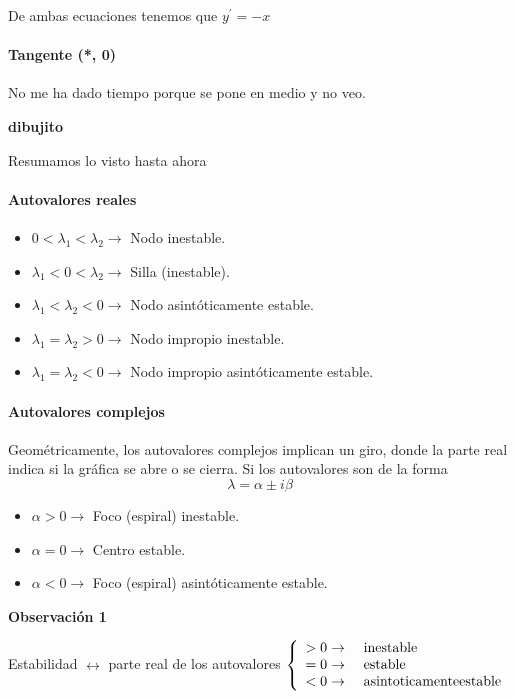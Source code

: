 \begin{example}
De ambas ecuaciones tenemos que $y^\prime = -x$

\paragraph{Tangente (*, 0)}
No me ha dado tiempo porque se pone en medio y no veo.

\textbf{dibujito}

\end{example}

Resumamos lo visto hasta ahora
\paragraph{Autovalores reales}
\begin{itemize}
\item $0< \lambda_1 < \lambda_2 \rightarrow$ Nodo inestable.
\item $\lambda_1 < 0 < \lambda_2 \rightarrow$ Silla (inestable).
\item $\lambda_1 < \lambda_2 < 0 \rightarrow$ Nodo asintóticamente estable.
\item $\lambda_1 = \lambda_2 > 0 \rightarrow$ Nodo impropio inestable.
\item $\lambda_1 = \lambda_2 < 0 \rightarrow$ Nodo impropio asintóticamente estable.
\end{itemize}

\paragraph{Autovalores complejos}
Geométricamente, los autovalores complejos implican un giro, donde la parte real indica si la gráfica se abre o se cierra.
Si los autovalores son de la forma
$$\lambda = \alpha \pm i\beta$$
\begin{itemize}
\item $\alpha > 0 \rightarrow$ Foco (espiral) inestable.
\item $\alpha = 0 \rightarrow$ Centro estable.
\item $\alpha < 0 \rightarrow$ Foco (espiral) asintóticamente estable.
\end{itemize}

\textbf{Observación 1} 

Estabilidad $\leftrightarrow$ parte real de los autovalores $
\left\lbrace 
\begin{array}{l l}
> 0 \rightarrow &\text{ inestable}\\
= 0 \rightarrow &\text{ estable}\\
< 0 \rightarrow &\text{ asintoticamenteestable}\\
\end{array}
\right. 
$

